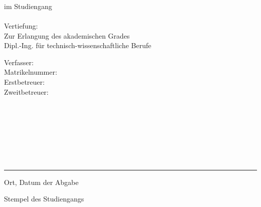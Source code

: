 \begin{titlepage}
\centering
	\sodef{}
	 \\
	\vspace{0,53cm}
	{\huge\bfseries \Projekttitel\\}
	\vspace{0,9cm}
	{\large \Projektuntertitel\\}
	\vspace{0,6cm}
	{\large im Studiengang\\}
	{\large\bfseries \Studiengang \\}
	{\large Vertiefung: \Vertiefungsrichtung\\}
	\vspace{0,53cm}
	{Zur Erlangung des akademischen Grades\\}
	{Dipl.-Ing. für technisch-wissenschaftliche Berufe\\}
	\vspace{\fill}
	\raggedright
\begin{minipage}{5,0cm}
	\sffamily
	\raggedright
	Verfasser: \\
	\vspace{\baselineskip}
	Matrikelnummer:\\
	\vspace{\baselineskip}
	Erstbetreuer:\\
	\vspace{\baselineskip}
	Zweitbetreuer:\\
	\vspace{\baselineskip}
	~\\
\end{minipage}
\begin{minipage}{0.45\textwidth}
	\sffamily
	\raggedright
	\Student \\
	\vspace{\baselineskip} 
	\Matrikelnummer\\
	\vspace{\baselineskip}
	\BetreuerA \\
	\vspace{\baselineskip}	
	\BetreuerB \\
	\vspace{\baselineskip}
	\BetreuerC \\
\end{minipage}
\hfill
\begin{minipage}{5,0cm}
	\sffamily
	\raggedright
	\hfill
\end{minipage}
\begin{minipage}{0.45\textwidth}
	\sffamily
	\raggedright

\end{minipage}


\vspace{26mm}
\parbox{7.7cm}{\centering\hrule\medskip Ort, Datum der Abgabe}
\vspace{0.0cm}
\hfill
\parbox{0.7cm}{ }
\parbox{6cm}{\raggedleft\medskip Stempel des Studiengangs}
\vspace{0.0cm}
\end{titlepage}
\cleardoublepage
\restoregeometry
\clearscrheadings%
\ifoot[\Student]{\parbox[b][5mm]{5cm}{\Student}}
\ofoot[\pagemark]{\parbox[b][5mm]{5cm}{\raggedleft \pagemark}}
\renewcommand{\arbeit}{DIPLOMARBEIT }